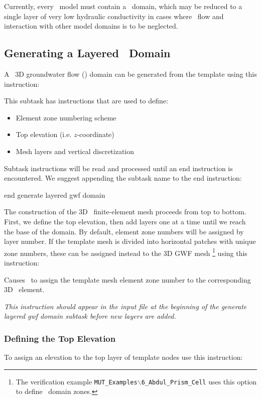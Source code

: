 \label{texfile:GWF}
Currently, every \mfus\ model must contain a \gwf\ domain, which may be reduced to a single layer of very low hydraulic conductivity in cases where \gwf\ flow and interaction with other model domains is to be neglected.

\subsection{Generating a Layered \gwf\ Domain}
A \mfus\ 3D groundwater flow (\gwf) domain can be generated from the template using this instruction:

    {This subtask has instructions that are used to define:
     \begin{itemize}
        \item Element zone numbering scheme
        \item Top elevation (i.e. $z$-coordinate)
        \item Mesh layers and vertical discretization
    \end{itemize}

    Subtask instructions will be read and processed until an \textsf{end} instruction is encountered.  We suggest appending the subtask name to the \textsf{end} instruction:

    {\Large \sf end generate layered gwf domain}
    }

The construction of the 3D \gwf\ finite-element mesh proceeds from top to bottom.  First, we define the top elevation, then add layers one at a time until we reach the base of the domain. By default, element zone numbers will be assigned by layer number.  If the template mesh is divided into horizontal patches with unique zone numbers, these can be assigned instead to the 3D GWF mesh \footnote{The verification example \texttt{MUT\_Examples$\backslash$6\_Abdul\_Prism\_Cell} uses this option to define \swf\ domain zones.} using this instruction:

    {Causes \mut\ to assign the template mesh element zone number to the corresponding 3D \gwf\ element.

    {\em This instruction should appear in the input file at the beginning of the \textsf{generate layered gwf domain} subtask before new layers are added.}
    }

\subsubsection{Defining the Top Elevation} \label{section:topelev}
To assign an elevation to the top layer of template nodes use this instruction:

